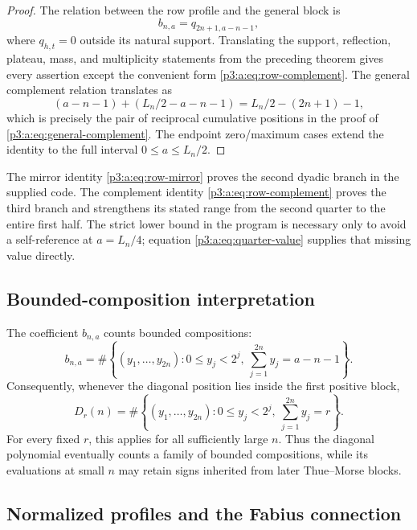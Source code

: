 \documentclass[11pt,oneside]{article}
\numberwithin{equation}{section}
\theoremstyle{definition}
\theoremstyle{remark}
\begin{document}
\begin{proof}
The relation between the row profile and the general block is
\begin{equation}
 b_{n,a}=q_{2n+1,a-n-1},
 \label{p3:a:eq:b-q-shift}
\end{equation}
where \(q_{h,t}=0\) outside its natural support.  Translating the support,
reflection, plateau, mass, and multiplicity statements from the preceding
theorem gives every assertion except the convenient form
\eqref{p3:a:eq:row-complement}.  The general complement relation translates as
\[
 (a-n-1)+(L_n/2-a-n-1)
 =L_n/2-(2n+1)-1,
\]
which is precisely the pair of reciprocal cumulative positions in the proof
of \eqref{p3:a:eq:general-complement}.  The endpoint zero/maximum cases extend the
identity to the full interval \(0\le a\le L_n/2\).
\end{proof}

The mirror identity \eqref{p3:a:eq:row-mirror} proves the second dyadic branch in
the supplied code.  The complement identity \eqref{p3:a:eq:row-complement} proves
the third branch and strengthens its stated range from the second quarter to
the entire first half.  The strict lower bound in the program is necessary
only to avoid a self-reference at \(a=L_n/4\); equation
\eqref{p3:a:eq:quarter-value} supplies that missing value directly.

\subsection{Bounded-composition interpretation}

The coefficient \(b_{n,a}\) counts bounded compositions:
\begin{equation}
 b_{n,a}
 =\#\left\{(y_1,\ldots,y_{2n}):
 0\le y_j<2^j,
 \ \sum_{j=1}^{2n}y_j=a-n-1\right\}.
 \label{p3:a:eq:bounded-composition}
\end{equation}
Consequently, whenever the diagonal position lies inside the first positive
block,
\begin{equation}
 D_r(n)=
 \#\left\{(y_1,\ldots,y_{2n}):
 0\le y_j<2^j,
 \ \sum_{j=1}^{2n}y_j=r\right\}.
 \label{p3:a:eq:diagonal-composition}
\end{equation}
For every fixed \(r\), this applies for all sufficiently large \(n\).  Thus the
diagonal polynomial eventually counts a family of bounded compositions, while
its evaluations at small \(n\) may retain signs inherited from later
Thue--Morse blocks.

\subsection{Normalized profiles and the Fabius connection}
\end{document}
